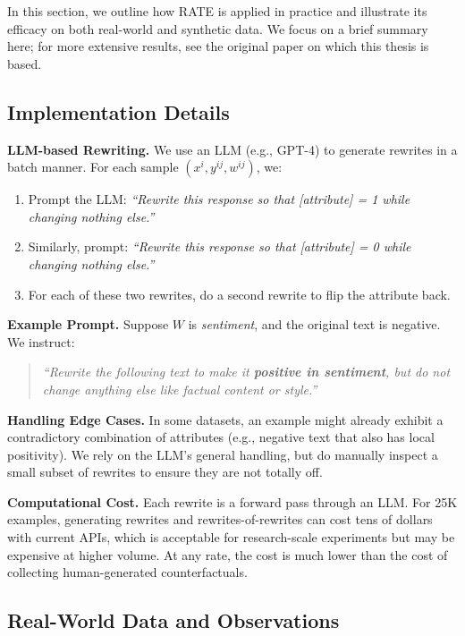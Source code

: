 \documentclass{article}
\theoremstyle{definition}
\begin{document}
In this section, we outline how RATE is applied in practice and illustrate its efficacy on both real-world and synthetic data. We focus on a brief summary here; for more extensive results, see the original paper on which this thesis is based.

\subsection{Implementation Details}

\textbf{LLM-based Rewriting.} We use an LLM (e.g., GPT-4) to generate rewrites in a batch manner. For each sample $(x^i, y^{ij}, w^{ij})$, we:
\begin{enumerate}
    \item Prompt the LLM: \emph{``Rewrite this response so that [attribute] = 1 while changing nothing else.''}
    \item Similarly, prompt: \emph{``Rewrite this response so that [attribute] = 0 while changing nothing else.''}
    \item For each of these two rewrites, do a second rewrite to flip the attribute back.
\end{enumerate}

\textbf{Example Prompt.} Suppose $W$ is \emph{sentiment}, and the original text is negative. We instruct:  
\begin{quote}
\textit{``Rewrite the following text to make it \textbf{positive in sentiment}, but do not change anything else like factual content or style.''}
\end{quote}

\textbf{Handling Edge Cases.} In some datasets, an example might already exhibit a contradictory combination of attributes (e.g., negative text that also has local positivity). We rely on the LLM’s general handling, but do manually inspect a small subset of rewrites to ensure they are not totally off.

\textbf{Computational Cost.} Each rewrite is a forward pass through an LLM. For 25K examples, generating rewrites and rewrites-of-rewrites can cost tens of dollars with current APIs, which is acceptable for research-scale experiments but may be expensive at higher volume. At any rate, the cost is much lower than the cost of collecting human-generated counterfactuals.

\subsection{Real-World Data and Observations}
\end{document}
